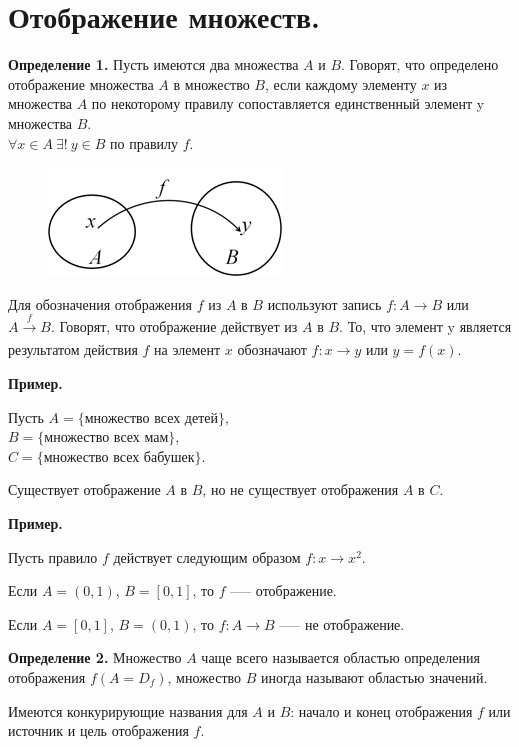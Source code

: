 \documentclass{article}
\begin{document}
    \section{Отображение множеств.}

    \textbf{Определение 1.} Пусть имеются два множества $A$ и $B$. Говорят, что определено отображение множества $A$ в множество $B$, если каждому элементу $x$ из множества $A$ по некоторому правилу сопоставляется единственный элемент y множества $B$.\\
    $\forall x \in A\ \exists!\ y \in B$ по правилу $f$.
    
    \begin{figure}[h!]
    \centering
    \includegraphics[scale=0.75]{2_1}
    \end{figure}

    Для обозначения отображения $f$ из $A$ в $B$ используют запись $f: A \rightarrow B$ или $A \xrightarrow[]{f} B$. Говорят, что отображение действует из $A$ в $B$. То, что элемент y является результатом действия $f$ на элемент $x$ обозначают $f: x \rightarrow y$ или $y = f(x)$.

    \textbf{Пример.}

    Пусть $A = \{$множество всех детей$\}$,\\
    $B = \{$множество всех мам$\}$,\\
    $C = \{$множество всех бабушек$\}$.

    Существует отображение $A$ в $B$, но не существует отображения $A$ в $C$.  
    
    \textbf{Пример.}
    
    Пусть правило $f$ действует следующим образом $f: x \rightarrow x^2$.
    
    Если $A = (0, 1)$, $B = [0, 1]$, то $f$ —-- отображение.
    
    Если $A = [0, 1]$, $B = (0, 1)$, то $f: A \rightarrow B$ —-- не отображение. 

    \textbf{Определение 2.} Множество $A$ чаще всего называется областью определения отображения $f (A = D_f)$, множество $B$ иногда называют областью значений.

    Имеются конкурирующие названия для $A$ и $B$: начало и конец отображения $f$ или источник и цель отображения $f$. 
    
\end{document}
